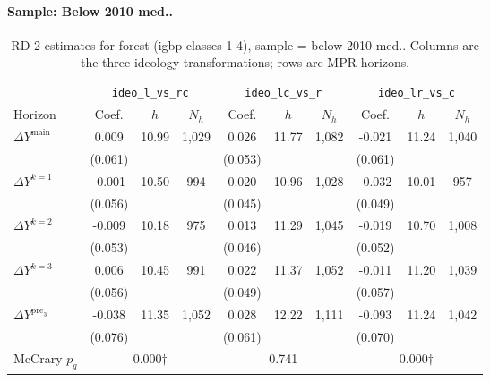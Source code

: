 \documentclass[11pt]{article}
\begin{document}
\paragraph{Sample: Below 2010 med..}
\begin{table}[H]
\centering
\scriptsize
\caption{RD-2 estimates for forest (igbp classes 1-4), sample = below 2010 med..
Columns are the three ideology transformations; rows are MPR horizons.}
\label{tab:rd2_forest_below}
\begin{tabular}{l ccc ccc ccc}
\toprule
 & \multicolumn{3}{c}{\texttt{ideo\_l\_vs\_rc}}
 & \multicolumn{3}{c}{\texttt{ideo\_lc\_vs\_r}}
 & \multicolumn{3}{c}{\texttt{ideo\_lr\_vs\_c}} \\
\cmidrule(lr){2-4} \cmidrule(lr){5-7} \cmidrule(lr){8-10}
Horizon & Coef. & $h$ & $N_h$ & Coef. & $h$ & $N_h$ & Coef. & $h$ & $N_h$ \\
\midrule
$\Delta Y^{\text{main}}$ & 0.009 & 10.99 & 1,029 & 0.026 & 11.77 & 1,082 & -0.021 & 11.24 & 1,040 \\
 & (0.061) &  &  & (0.053) &  &  & (0.061) &  &  \\
\addlinespace[1pt]
$\Delta Y^{k=1}$ & -0.001 & 10.50 & 994 & 0.020 & 10.96 & 1,028 & -0.032 & 10.01 & 957 \\
 & (0.056) &  &  & (0.045) &  &  & (0.049) &  &  \\
\addlinespace[1pt]
$\Delta Y^{k=2}$ & -0.009 & 10.18 & 975 & 0.013 & 11.29 & 1,045 & -0.019 & 10.70 & 1,008 \\
 & (0.053) &  &  & (0.046) &  &  & (0.052) &  &  \\
\addlinespace[1pt]
$\Delta Y^{k=3}$ & 0.006 & 10.45 & 991 & 0.022 & 11.37 & 1,052 & -0.011 & 11.20 & 1,039 \\
 & (0.056) &  &  & (0.049) &  &  & (0.057) &  &  \\
\addlinespace[1pt]
$\Delta Y^{\text{pre}_3}$ & -0.038 & 11.35 & 1,052 & 0.028 & 12.22 & 1,111 & -0.093 & 11.24 & 1,042 \\
 & (0.076) &  &  & (0.061) &  &  & (0.070) &  &  \\
\addlinespace[1pt]
\midrule
McCrary $p_q$ & \multicolumn{3}{c}{0.000$\dagger$} & \multicolumn{3}{c}{0.741} & \multicolumn{3}{c}{0.000$\dagger$} \\
\bottomrule
\end{tabular}
\end{table}
\end{document}
